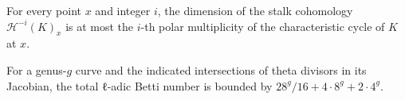 \begin{theorem}
\label{bounds-stalks-perverse-sheaves-characteristic-p-shende-main}
For every point $x$ and integer $i$, the dimension of the stalk cohomology $\mathcal H^{-i}(K)_x$ is at most the $i$-th polar multiplicity of the characteristic cycle of $K$ at $x$.
\notready
\end{theorem}

\begin{theorem}
\label{bounds-stalks-perverse-sheaves-characteristic-p-shende-secondary}
For a genus-$g$ curve and the indicated intersections of theta divisors in its Jacobian, the total ℓ-adic Betti number is bounded by $28^g/16+4\cdot 8^g+2\cdot 4^g$.
\notready
\end{theorem}
